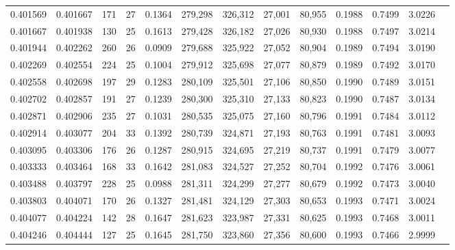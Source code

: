 \begin{tabular}{rrrrrrrrrrrrr}
0.401569 & 0.401667 &    171 &    27 &                                     0.1364 & 279,298 & 326,312 &  27,001 &  80,955 & 0.1988 & 0.7499 & 3.0226 \\
0.401667 & 0.401938 &    130 &    25 &                                     0.1613 & 279,428 & 326,182 &  27,026 &  80,930 & 0.1988 & 0.7497 & 3.0214 \\
0.401944 & 0.402262 &    260 &    26 &                                     0.0909 & 279,688 & 325,922 &  27,052 &  80,904 & 0.1989 & 0.7494 & 3.0190 \\
0.402269 & 0.402554 &    224 &    25 &                                     0.1004 & 279,912 & 325,698 &  27,077 &  80,879 & 0.1989 & 0.7492 & 3.0170 \\
0.402558 & 0.402698 &    197 &    29 &                                     0.1283 & 280,109 & 325,501 &  27,106 &  80,850 & 0.1990 & 0.7489 & 3.0151 \\
0.402702 & 0.402857 &    191 &    27 &                                     0.1239 & 280,300 & 325,310 &  27,133 &  80,823 & 0.1990 & 0.7487 & 3.0134 \\
0.402871 & 0.402906 &    235 &    27 &                                     0.1031 & 280,535 & 325,075 &  27,160 &  80,796 & 0.1991 & 0.7484 & 3.0112 \\
0.402914 & 0.403077 &    204 &    33 &                                     0.1392 & 280,739 & 324,871 &  27,193 &  80,763 & 0.1991 & 0.7481 & 3.0093 \\
0.403095 & 0.403306 &    176 &    26 &                                     0.1287 & 280,915 & 324,695 &  27,219 &  80,737 & 0.1991 & 0.7479 & 3.0077 \\
0.403333 & 0.403464 &    168 &    33 &                                     0.1642 & 281,083 & 324,527 &  27,252 &  80,704 & 0.1992 & 0.7476 & 3.0061 \\
0.403488 & 0.403797 &    228 &    25 &                                     0.0988 & 281,311 & 324,299 &  27,277 &  80,679 & 0.1992 & 0.7473 & 3.0040 \\
0.403803 & 0.404071 &    170 &    26 &                                     0.1327 & 281,481 & 324,129 &  27,303 &  80,653 & 0.1993 & 0.7471 & 3.0024 \\
0.404077 & 0.404224 &    142 &    28 &                                     0.1647 & 281,623 & 323,987 &  27,331 &  80,625 & 0.1993 & 0.7468 & 3.0011 \\
0.404246 & 0.404444 &    127 &    25 &                                     0.1645 & 281,750 & 323,860 &  27,356 &  80,600 & 0.1993 & 0.7466 & 2.9999 \\

\end{tabular}
